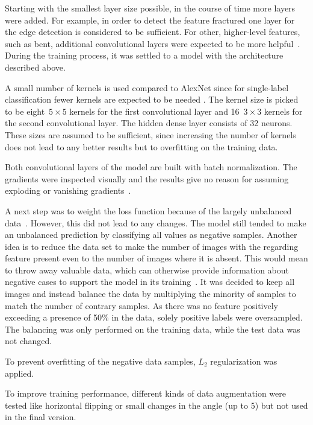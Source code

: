 Starting with the smallest layer size possible, in the course of time more layers were added. For example, in order to detect the feature fractured one layer for the edge detection is considered to be sufficient. For other, higher-level features, such as bent, additional convolutional layers were expected to be more helpful~\citep{geron2019hands}. During the training process, it was settled to a model with the architecture described above.
 
A small number of kernels is used compared to AlexNet since for single-label classification fewer kernels are expected to be needed \citep{geron2019hands}. The kernel size is picked to be eight~$5\times5$ kernels for the first convolutional layer and 16~$3\times3$ kernels for the second convolutional layer. The hidden dense layer consists of 32 neurons. These sizes are assumed to be sufficient, since increasing the number of kernels does not lead to any better results but to overfitting on the training data.
 
Both convolutional layers of the model are built with batch normalization. The gradients were inspected visually and the results give no reason for assuming exploding or vanishing gradients~\citep{pascanu2012understanding}.
 
A next step was to weight the loss function because of the largely unbalanced data~\citep{he2009learning,batista2004study}. However, this did not lead to any changes. The model still tended to make an unbalanced prediction by classifying all values as negative samples. Another idea is to reduce the data set to make the number of images with the regarding feature present even to the number of images where it is absent. This would mean to throw away valuable data, which can otherwise provide information about negative cases to support the model in its training~\citep{batista2004study}. It was decided to keep all images and instead balance the data by multiplying the minority of samples to match the number of contrary samples. As there was no feature positively exceeding a presence of 50\% in the data, solely positive labels were oversampled. The balancing was only performed on the training data, while the test data was not changed.
 
To prevent overfitting of the negative data samples, \(L_2\) regularization was applied.
 
To improve training performance, different kinds of data augmentation were tested \citep{brownlee2019augmentation} like horizontal flipping or small changes in the angle (up to 5\textdegree ) but not used in the final version.

